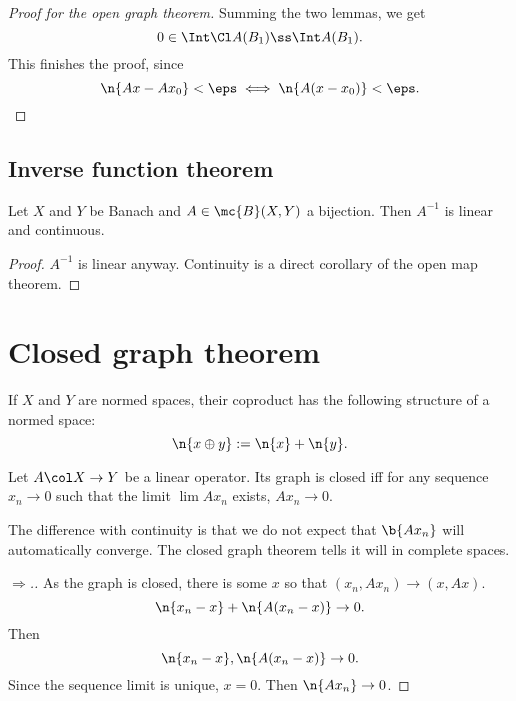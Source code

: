 \begin{proof}[Proof for the open graph theorem]
  Summing the two lemmas, we get
  $$ 0 \in \Int \Cl A(B_1) \ss \Int A(B_1). $$
  This finishes the proof, since
  $$ \n{Ax-Ax_0} < \eps \iff \n{A(x-x_0)} < \eps. $$
\end{proof}

\subsection{Inverse function theorem}

\begin{theorem}
  Let $X$ and $Y$ be Banach and $A \in \mc{B}(X, Y)$ a bijection.
  Then $A^{-1}$ is linear and continuous.
\end{theorem}

\begin{proof}
  $A^{-1}$ is linear anyway.
  Continuity is a direct corollary of the open map theorem.
\end{proof}

\section{Closed graph theorem}

\begin{definition}
  If $X$ and $Y$ are normed spaces, their coproduct has the following structure of a normed space:
  $$ \n{x \oplus y} := \n{x} + \n{y}. $$
\end{definition}

\begin{lemma}
  Let $A \col X \to Y$ be a linear operator. Its graph is closed iff for any sequence $x_n \to 0$ such that the limit $\lim Ax_n$ exists, $Ax_n \to 0$.
\end{lemma}

\begin{remark}
  The difference with continuity is that we do not expect that $\b{Ax_n}$ will automatically converge.
  The closed graph theorem tells it will in complete spaces.
\end{remark}

\begin{proof}[$\Rightarrow$.]
  As the graph is closed, there is some $x$ so that $(x_n, Ax_n) \to (x, Ax)$.
  $$ \n{x_n-x}+\n{A(x_n-x)} \to 0. $$
  Then
  $$ \n{x_n-x}, \n{A(x_n-x)} \to 0. $$
  Since the sequence limit is unique, $x = 0$.
  Then $\n{Ax_n} \to 0$.
\end{proof}

